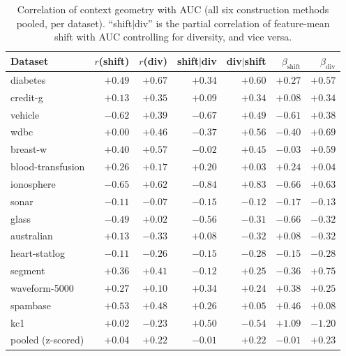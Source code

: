 \documentclass{article}
\begin{document}
\begin{table}[h]
\centering
\caption{Correlation of context geometry with AUC (all six construction methods pooled, per dataset). ``shift$\mid$div'' is the partial correlation of feature-mean shift with AUC controlling for diversity, and vice versa.}
\label{tab:partial}
\small
\begin{tabular}{lrrrrrr}
\toprule
Dataset & $r$(shift) & $r$(div) & shift$\mid$div & div$\mid$shift & $\beta_{\text{shift}}$ & $\beta_{\text{div}}$ \\
\midrule
diabetes           & $+0.49$ & $+0.67$ & $+0.34$ & $+0.60$ & $+0.27$ & $+0.57$ \\
credit-g           & $+0.13$ & $+0.35$ & $+0.09$ & $+0.34$ & $+0.08$ & $+0.34$ \\
vehicle            & $-0.62$ & $+0.39$ & $-0.67$ & $+0.49$ & $-0.61$ & $+0.38$ \\
wdbc               & $+0.00$ & $+0.46$ & $-0.37$ & $+0.56$ & $-0.40$ & $+0.69$ \\
breast-w           & $+0.40$ & $+0.57$ & $-0.02$ & $+0.45$ & $-0.03$ & $+0.59$ \\
blood-transfusion  & $+0.26$ & $+0.17$ & $+0.20$ & $+0.03$ & $+0.24$ & $+0.04$ \\
ionosphere         & $-0.65$ & $+0.62$ & $-0.84$ & $+0.83$ & $-0.66$ & $+0.63$ \\
sonar              & $-0.11$ & $-0.07$ & $-0.15$ & $-0.12$ & $-0.17$ & $-0.13$ \\
glass              & $-0.49$ & $+0.02$ & $-0.56$ & $-0.31$ & $-0.66$ & $-0.32$ \\
australian         & $+0.13$ & $-0.33$ & $+0.08$ & $-0.32$ & $+0.08$ & $-0.32$ \\
heart-statlog      & $-0.11$ & $-0.26$ & $-0.15$ & $-0.28$ & $-0.15$ & $-0.28$ \\
segment            & $+0.36$ & $+0.41$ & $-0.12$ & $+0.25$ & $-0.36$ & $+0.75$ \\
waveform-5000      & $+0.27$ & $+0.10$ & $+0.34$ & $+0.24$ & $+0.38$ & $+0.25$ \\
spambase           & $+0.53$ & $+0.48$ & $+0.26$ & $+0.05$ & $+0.46$ & $+0.08$ \\
kc1                & $+0.02$ & $-0.23$ & $+0.50$ & $-0.54$ & $+1.09$ & $-1.20$ \\
\midrule
pooled (z-scored)  & $+0.04$ & $+0.22$ & $-0.01$ & $+0.22$ & $-0.01$ & $+0.23$ \\
\bottomrule
\end{tabular}
\end{table}
\end{document}
